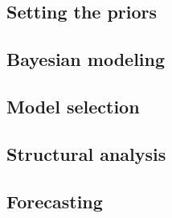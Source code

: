\documentclass[
]{jss}
\begin{document}
\subsection{Setting the priors}\label{setting-the-priors}

\subsection{Bayesian modeling}\label{bayesian-modeling}

\subsection{Model selection}\label{model-selection}

\subsection{Structural analysis}\label{structural-analysis}

\subsection{Forecasting}\label{forecasting}

\renewcommand\refname{Conclusion}

\end{document}
